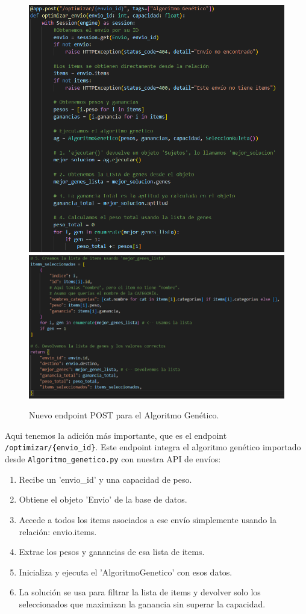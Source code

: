 \documentclass[12pt]{article}
\begin{document}
\begin{figure}[H]
    \centering
    \includegraphics[width=1\textwidth]{Imagenes/Prac4_5.1.png}
    \includegraphics[width=1\textwidth]{Imagenes/Prac4_5.2.png}
    \caption{Nuevo endpoint POST para el Algoritmo Genético.}
\end{figure}

Aqui tenemos la adición más importante, que es el endpoint \texttt{/optimizar/\{envio\_id\}}. Este endpoint integra el algoritmo genético importado desde \texttt{Algoritmo\_genetico.py} con nuestra API de envíos:
\begin{enumerate}
    \item Recibe un 'envio\_id' y una capacidad de peso.
    \item Obtiene el objeto 'Envio' de la base de datos.
    \item Accede a todos los items asociados a ese envío simplemente usando la relación: envio.items.
    \item Extrae los pesos y ganancias de esa lista de items.
    \item Inicializa y ejecuta el 'AlgoritmoGenetico' con esos datos.
    \item La solución se usa para filtrar la lista de items y devolver solo los seleccionados que maximizan la ganancia sin superar la capacidad.
\end{enumerate}
\end{document}
